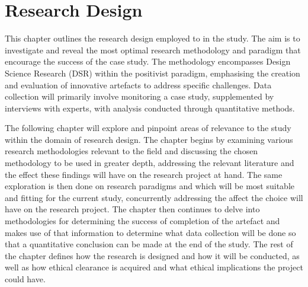 \chapter{Research Design}
\par{This chapter outlines the research design employed to in the study. The aim is to investigate and reveal the most optimal research methodology and paradigm that encourage the success of the case study. The methodology encompasses Design Science Research (DSR) within the positivist paradigm, emphasising the creation and evaluation of innovative artefacts to address specific challenges. Data collection will primarily involve monitoring a case study, supplemented by interviews with experts, with analysis conducted through quantitative methods.}
\par{The following chapter will explore and pinpoint areas of relevance to the study within the domain of research design. The chapter begins by examining various research methodologies relevant to the field and discussing the chosen methodology to be used in greater depth, addressing the relevant literature and the effect these findings will have on the research project at hand. The same exploration is then done on research paradigms and which will be most suitable and fitting for the current study, concurrently addressing the affect the choice will have on the research project. The chapter then continues to delve into methodologies for determining the success of completion of the artefact and makes use of that information to determine what data collection will be done so that a quantitative conclusion can be made at the end of the study. The rest of the chapter defines how the research is designed and how it will be conducted, as well as how ethical clearance is acquired and what ethical implications the project could have.}


